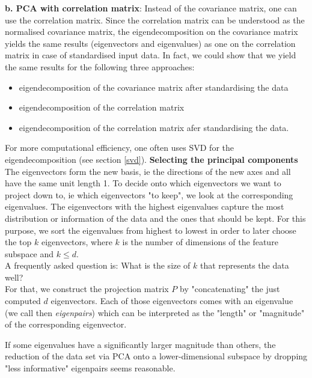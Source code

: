 \documentclass[journal, a4paper]{IEEEtran}
\begin{document}
\textbf{b. PCA with correlation matrix}: 
Instead of the covariance matrix, one can use the correlation matrix. 
Since the correlation matrix can be understood as the normalised covariance matrix, the eigendecomposition on the covariance matrix yields the same results (eigenvectors and eigenvalues) as one on the correlation matrix in case of standardised input data. 
In fact, we could show that we yield the same results for the following three approaches:
\begin{itemize}
\item eigendecomposition of the covariance matrix after standardising the data
\item eigendecomposition of the correlation matrix
\item eigendecomposition of the correlation matrix afer standardising the data.
\end{itemize}
For more computational efficiency, one often uses SVD for the eigendecomposition (see section \ref{svd}).
\newline
\textbf{Selecting the principal components}\\
The eigenvectors form the new basis, ie the directions of the new axes and all have the same unit length 1. To decide onto which eigenvectors we want to project down to, ie which eigenvectors "to keep", we look at the corresponding eigenvalues. The eigenvectors with the highest eigenvalues capture the most distribution or information of the data and the ones that should be kept. 
For this purpose, we sort the eigenvalues from highest to lowest in order to later choose the top \( k \) eigenvectors, where \( k \) is the number of dimensions of the feature subspace and \( k \leq d \). \\
A frequently asked question is: What is the size of \( k \) that represents the data well?\\


For that, we construct the projection matrix \( P \) by "concatenating" the just computed \( d \) eigenvectors. Each of those eigenvectors comes with an eigenvalue (we call then \textit{eigenpairs}) which can be interpreted as the "length" or "magnitude" of the corresponding eigenvector. 

If some eigenvalues have a significantly larger magnitude than others, the reduction of the data set via PCA onto a lower-dimensional subspace by dropping "less informative" eigenpairs seems reasonable.
\end{document}
